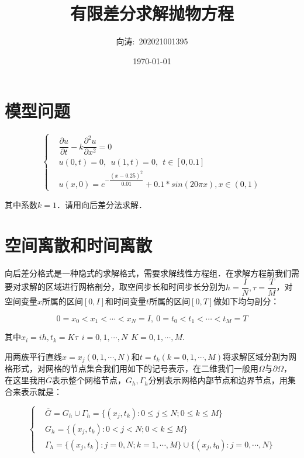 \documentclass[UTF8]{ctexart}
\title{有限差分求解抛物方程}
\author{向涛:~202021001395}
\date{\today}
\begin{document}
\maketitle
\section{模型问题}
\begin{equation}
\left \{
\begin{aligned}
& \dfrac{\partial u}{\partial t}-k\dfrac{\partial^2 u}{\partial x^2}=0 \\
& u(0,t)=0,~~u(1,t)=0,~~t\in [0,0.1] \\
& u(x,0) = e^{-\dfrac{(x-0.25)^2}{0.01}}+0.1*sin(20\pi x), x\in (0,1)
\end{aligned}
\right.
\end{equation}

其中系数$k=1$．请用向后差分法求解．

\section{空间离散和时间离散}

向后差分格式是一种隐式的求解格式，需要求解线性方程组．在求解方程前我们需要对求解的区域进行网格剖分，取空间步长和时间步长分别为$h=\dfrac{I}{N},\tau= \dfrac{T}{M}$，对空间变量$x$所属的区间$[0,I]$和时间变量$t$所属的区间$[0,T]$做如下均匀剖分：

\begin{equation}
0=x_0<x_1<\cdots<x_N=I,~0=t_0<t_1<\cdots<t_M=T
\end{equation}

其中$x_i = ih,t_k=K\tau~~i=0,1,\cdots,N~~K=0,1,\cdots,M$.

用两族平行直线$x=x_j(0,1,\cdots,N)$和$t=t_k(k=0,1,\cdots,M)$将求解区域分割为网格形式，对网格的节点集合我们用如下的记号表示，在二维我们一般用$\Omega$与$\partial\Omega$，在这里我用$\overline{G}$表示整个网格节点，$G_h,\Gamma_h$分别表示网格内部节点和边界节点，用集合来表示就是：

\begin{equation}
\left \{
\begin{aligned}
& \overline{G}=G_h \cup \Gamma_h=\{ (x_j,t_k):0\leq j\leq N;0\leq k \leq M \}　\\
& G_h = \{ (x_j,t_k):0<j<N;0<k\leq M \} \\
& \Gamma_h=\{ (x_j,t_k):j=0,N;k=1,\cdots,M \} \cup \{  (x_j,t_0):j=0,\cdots,N \}
\end{aligned}
\right.
\end{equation}
\end{document}
